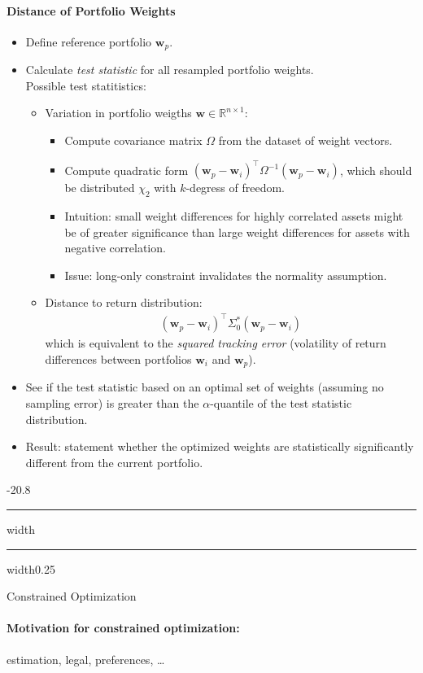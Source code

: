\documentclass[a4paper,landscape,8pt,fleqn]{scrartcl}
\makeatletter
\renewcommand{\subsection}{\@startsection{subsection}{1}{0mm}%
{-2\baselineskip}{0.8\baselineskip}%
{\hrule depth 0.2pt width\columnwidth\hrule depth0.75pt
width0.25\columnwidth\vspace*{1.2em}\large\bfseries}}
\makeatother
\begin{document}
\begin{multicols*}{3}
\paragraph{Distance of Portfolio Weights}
\begin{itemize}
\item Define reference portfolio $\bm w_p$.
\item Calculate \textit{test statistic} for all resampled portfolio weights. \\
Possible test statitistics:
\begin{itemize}
\item Variation in portfolio weigths $\bm w \in \mathbb{R}^{n \times 1}$:
\begin{itemize}
\item Compute covariance matrix $\Omega$ from the dataset of weight vectors.
\item Compute quadratic form $(\bm w_p - \bm w_i)^\top \Omega^{-1} (\bm w_p - \bm w_i)$, which should be distributed $\chi_2$ with $k$-degress of freedom.
\item Intuition: small weight differences for highly correlated assets might be of greater significance than large weight differences for assets with negative correlation.
\item Issue: long-only constraint invalidates the normality assumption.
\end{itemize}
\item Distance to return distribution:
\begin{align*}
(\bm w_p - \bm w_i)^\top \Sigma_0^\ast (\bm w_p - \bm w_i)
\end{align*}
which is equivalent to the \textit{squared tracking error} (volatility of return differences between portfolios $\bm w_i$ and $\bm w_p$).
\end{itemize}
\item See if the test statistic based on an optimal set of weights (assuming no sampling error) is greater than the $\alpha$-quantile of the test statistic distribution.
\item Result: statement whether the optimized weights are statistically significantly different from the current portfolio.
\end{itemize}

\subsection{Constrained Optimization}

\paragraph{Motivation for constrained optimization:}
estimation, legal, preferences, \ldots


\end{multicols*}
\end{document}
